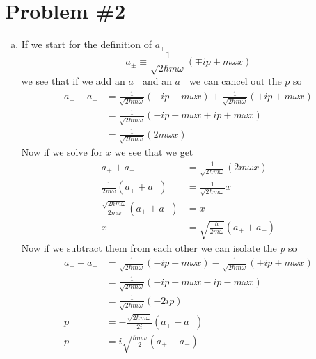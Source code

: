 \documentclass[11pt]{article}
\numberwithin{equation}{section}
\begin{document}
\section{Problem \#2}
\begin{enumerate}[(a)]
\item
If we start for the definition of $a_{\pm}$
$$a_{\pm}\equiv \frac{1}{\sqrt{2\hbar m\omega}}(\mp ip+m\omega x)$$
we see that if we add an $a_+$ and an $a_-$ we can cancel out the $p$ so
\begin{align*}
a_++a_- &= \frac{1}{\sqrt{2\hbar m\omega}}(-ip+m\omega x) + \frac{1}{\sqrt{2\hbar m\omega}}(+ip+m\omega x)\\
&= \frac{1}{\sqrt{2\hbar m\omega}}\left(-ip+m\omega x + ip+m\omega x\right)\\
&= \frac{1}{\sqrt{2\hbar m\omega}}\left(2m\omega x\right)
\end{align*}
Now if we solve for $x$ we see that we get
\begin{align*}
a_++a_- &= \frac{1}{\sqrt{2\hbar m\omega}}\left(2m\omega x\right)\\
\frac{1}{2m\omega}(a_++a_-) &= \frac{1}{\sqrt{2\hbar m\omega}} x\\
\frac{\sqrt{2\hbar m\omega}}{2m\omega}(a_++a_-) &= x\\
x &= \sqrt{\frac{\hbar}{2m\omega}}(a_++a_-)
\end{align*}
Now if we subtract them from each other we can isolate the $p$ so
\begin{align*}
a_+-a_- &= \frac{1}{\sqrt{2\hbar m\omega}}(-ip+m\omega x) - \frac{1}{\sqrt{2\hbar m\omega}}(+ip+m\omega x)\\
&= \frac{1}{\sqrt{2\hbar m\omega}}\left(-ip+m\omega x - ip-m\omega x\right)\\
&= \frac{1}{\sqrt{2\hbar m\omega}}\left(-2ip\right)\\
p &= -\frac{\sqrt{2\hbar m\omega}}{2i}(a_+-a_-)\\
p &= i\sqrt{\frac{\hbar m\omega}{2}}(a_+-a_-)
\end{align*}


\end{enumerate}
\end{document}
